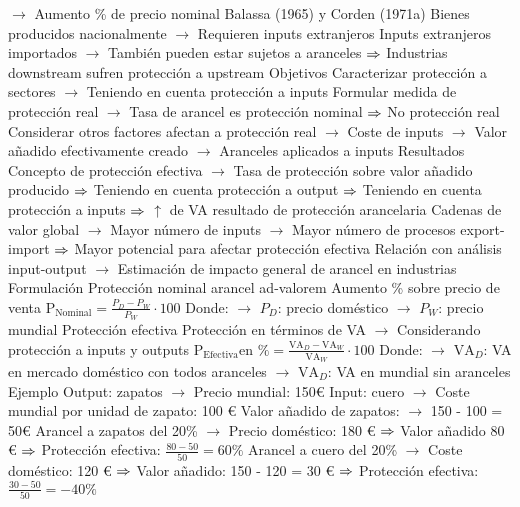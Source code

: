 \documentclass{nuevotema}
\begin{document}
\begin{esquemal}
				\4[] $\to$ Aumento \% de precio nominal
				\4[] Balassa (1965) y Corden (1971a)
				\4[] Bienes producidos nacionalmente
				\4[] $\to$ Requieren inputs extranjeros
				\4[] Inputs extranjeros importados
				\4[] $\to$ También pueden estar sujetos a aranceles
				\4[] $\Rightarrow$ Industrias downstream sufren protección a upstream
				\4 Objetivos
				\4[] Caracterizar protección a sectores
				\4[] $\to$ Teniendo en cuenta protección a inputs
				\4[] Formular medida de protección real
				\4[] $\to$ Tasa de arancel es protección nominal
				\4[] $\Rightarrow$ No protección real
				\4[] Considerar otros factores afectan a protección real
				\4[] $\to$ Coste de inputs
				\4[] $\to$ Valor añadido efectivamente creado
				\4[] $\to$ Aranceles aplicados a inputs
				\4 Resultados
				\4[] Concepto de protección efectiva
				\4[] $\to$ Tasa de protección sobre valor añadido producido
				\4[] $\Rightarrow$ Teniendo en cuenta protección a output
				\4[] $\Rightarrow$ Teniendo en cuenta protección a inputs
				\4[] $\Rightarrow$ $\uparrow$ de VA resultado de protección arancelaria
				\4[] Cadenas de valor global
				\4[] $\to$ Mayor número de inputs
				\4[] $\to$ Mayor número de procesos export-import
				\4[] $\Rightarrow$ Mayor potencial para afectar protección efectiva
				\4[] Relación con análisis input-output
				\4[] $\to$ Estimación de impacto general de arancel en industrias
			\3 Formulación
				\4 Protección nominal arancel ad-valorem
				\4[] Aumento \% sobre precio de venta
				\4[] $\text{P}_\text{Nominal} = \frac{P_D - P_W}{P_W} \cdot 100$
				\4[] Donde:
				\4[] $\to$ $P_D$: precio doméstico
				\4[] $\to$ $P_W$: precio mundial
				\4 Protección efectiva
				\4[] Protección en términos de VA
				\4[] $\to$ Considerando protección a inputs y outputs
				\4[] $\text{P}_\text{Efectiva} \text{en \%} = \frac{\text{VA}_D -  \text{VA}_W}{\text{VA}_W} \cdot 100 $
				\4[] Donde:
				\4[] $\to$ $\text{VA}_D$: VA en mercado doméstico con todos aranceles
				\4[] $\to$ $\text{VA}_D$: VA en mundial sin aranceles
				\4 Ejemplo
				\4[] Output: zapatos
				\4[] $\to$ Precio mundial: 150€
				\4[] Input: cuero
				\4[] $\to$ Coste mundial por unidad de zapato: 100 €
				\4[] Valor añadido de zapatos:
				\4[] $\to$ 150 - 100 = 50€
				\4[] Arancel a zapatos del 20\%
				\4[] $\to$ Precio doméstico: 180 €
				\4[] $\Rightarrow$ Valor añadido 80 €
				\4[] $\Rightarrow$ Protección efectiva: $\frac{80 - 50}{50} = 60\%$
				\4[] Arancel a cuero del 20\%
				\4[] $\to$ Coste doméstico: 120 €
				\4[] $\Rightarrow$ Valor añadido: 150 - 120 = 30 €
				\4[] $\Rightarrow$ Protección efectiva: $\frac{30 -50}{50} = -40\%$

\end{esquemal}
\end{document}
